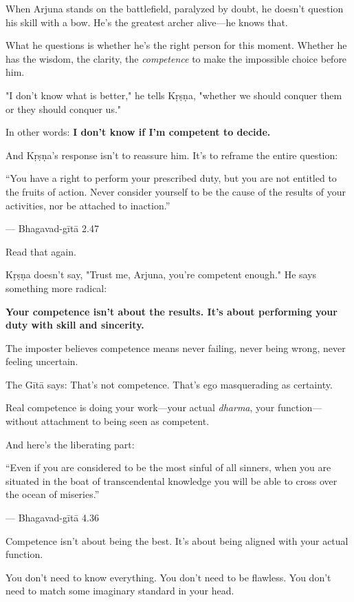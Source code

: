 \documentclass[11pt,twoside]{book}
\begin{document}
When Arjuna stands on the battlefield, paralyzed by doubt, he doesn't question his skill with a bow. He's the greatest archer alive—he knows that.

What he questions is whether he's the right person for this moment. Whether he has the wisdom, the clarity, the \emph{competence} to make the impossible choice before him.

"I don't know what is better," he tells Kṛṣṇa, "whether we should conquer them or they should conquer us."

In other words: \textbf{I don't know if I'm competent to decide.}

And Kṛṣṇa's response isn't to reassure him. It's to reframe the entire question:

\begin{pullquote}
``You have a right to perform your prescribed duty, but you are not entitled to the fruits of action. Never consider yourself to be the cause of the results of your activities, nor be attached to inaction.''

--- Bhagavad-gītā 2.47
\end{pullquote}

Read that again.

Kṛṣṇa doesn't say, "Trust me, Arjuna, you're competent enough." He says something more radical:

\textbf{Your competence isn't about the results. It's about performing your duty with skill and sincerity.}

The imposter believes competence means never failing, never being wrong, never feeling uncertain.

The Gītā says: That's not competence. That's ego masquerading as certainty.

Real competence is doing your work—your actual \emph{dharma}, your function—without attachment to being seen as competent.

And here's the liberating part:

\begin{pullquote}
``Even if you are considered to be the most sinful of all sinners, when you are situated in the boat of transcendental knowledge you will be able to cross over the ocean of miseries.''

--- Bhagavad-gītā 4.36
\end{pullquote}

Competence isn't about being the best. It's about being aligned with your actual function.

You don't need to know everything. You don't need to be flawless. You don't need to match some imaginary standard in your head.
\end{document}
